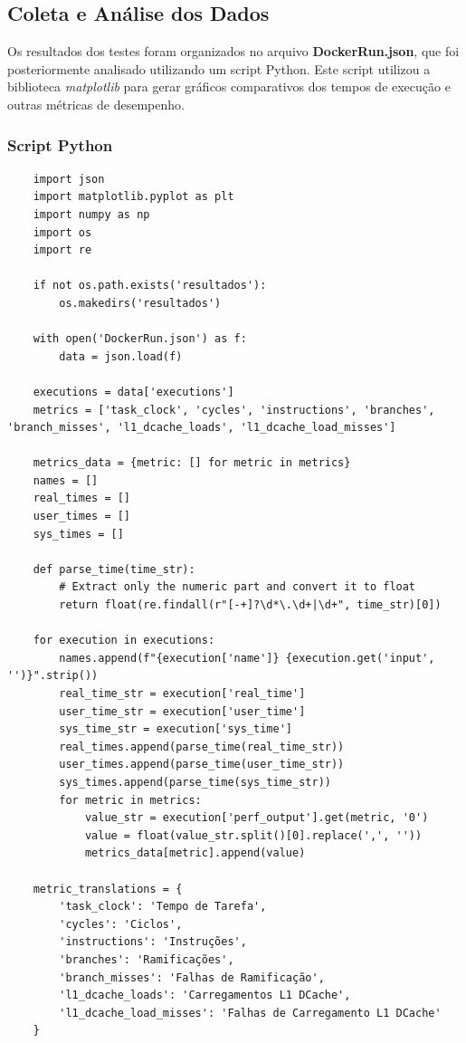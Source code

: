 \documentclass[12pt]{article}
\begin{document}
\subsection{Coleta e Análise dos Dados}
Os resultados dos testes foram organizados no arquivo \textbf{DockerRun.json}, que foi posteriormente analisado utilizando um script Python. Este script utilizou a biblioteca \textit{matplotlib} para gerar gráficos comparativos dos tempos de execução e outras métricas de desempenho.

\subsubsection{Script Python}
\begin{verbatim}
    import json
    import matplotlib.pyplot as plt
    import numpy as np
    import os
    import re
    
    if not os.path.exists('resultados'):
        os.makedirs('resultados')
    
    with open('DockerRun.json') as f:
        data = json.load(f)
    
    executions = data['executions']
    metrics = ['task_clock', 'cycles', 'instructions', 'branches', 'branch_misses', 'l1_dcache_loads', 'l1_dcache_load_misses']
    
    metrics_data = {metric: [] for metric in metrics}
    names = []
    real_times = []
    user_times = []
    sys_times = []
    
    def parse_time(time_str):
        # Extract only the numeric part and convert it to float
        return float(re.findall(r"[-+]?\d*\.\d+|\d+", time_str)[0])
    
    for execution in executions:
        names.append(f"{execution['name']} {execution.get('input', '')}".strip())
        real_time_str = execution['real_time']
        user_time_str = execution['user_time']
        sys_time_str = execution['sys_time']
        real_times.append(parse_time(real_time_str)) 
        user_times.append(parse_time(user_time_str)) 
        sys_times.append(parse_time(sys_time_str))   
        for metric in metrics:
            value_str = execution['perf_output'].get(metric, '0')
            value = float(value_str.split()[0].replace(',', ''))
            metrics_data[metric].append(value)
    
    metric_translations = {
        'task_clock': 'Tempo de Tarefa',
        'cycles': 'Ciclos',
        'instructions': 'Instruções',
        'branches': 'Ramificações',
        'branch_misses': 'Falhas de Ramificação',
        'l1_dcache_loads': 'Carregamentos L1 DCache',
        'l1_dcache_load_misses': 'Falhas de Carregamento L1 DCache'
    }
    

\end{verbatim}
\end{document}
